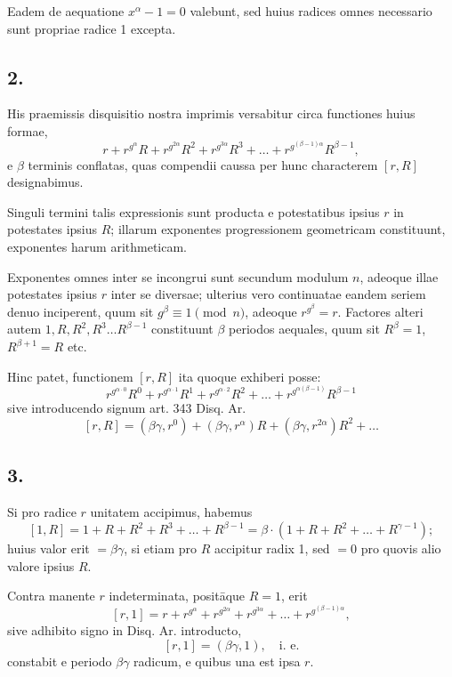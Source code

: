 \documentclass[12pt,a4paper]{article}
\begin{document}
Eadem de aequatione $x^\alpha-1=0$ valebunt, sed huius radices omnes necessario sunt propriae radice 1 excepta.

\subsection*{2.}

His praemissis disquisitio nostra imprimis versabitur circa functiones huius formae,
\[
r + r^{g^\alpha}R + r^{g^{2\alpha}}R^2 + r^{g^{3\alpha}}R^3 + \ldots + r^{g^{(\beta-1)\alpha}}R^{\beta-1},
\]
e $\beta$ terminis conflatas, quas compendii caussa per hunc characterem $[r,R]$ designabimus.

Singuli termini talis expressionis sunt producta e potestatibus ipsius $r$ in potestates ipsius $R$; illarum exponentes progressionem geometricam constituunt, exponentes harum arithmeticam.

Exponentes omnes inter se incongrui sunt secundum modulum $n$, adeoque illae potestates ipsius $r$ inter se diversae; ulterius vero continuatae eandem seriem denuo inciperent, quum sit $g^\beta\equiv 1 \pmod{n}$, adeoque $r^{g^\beta}=r$. Factores alteri autem $1, R, R^2, R^3\ldots R^{\beta-1}$ constituunt $\beta$ periodos aequales, quum sit $R^\beta=1$, $R^{\beta+1}=R$ etc.

Hinc patet, functionem $[r,R]$ ita quoque exhiberi posse:
\[
r^{g^{\alpha\cdot 0}}R^0 + r^{g^{\alpha\cdot 1}}R^1 + r^{g^{\alpha\cdot 2}}R^2 + \ldots + r^{g^{\alpha(\beta-1)}}R^{\beta-1}
\]
sive introducendo signum art. 343 Disq. Ar.
\[
[r,R] = (\beta\gamma, r^0) + (\beta\gamma, r^\alpha)R + (\beta\gamma, r^{2\alpha})R^2 + \ldots
\]

\subsection*{3.}

Si pro radice $r$ unitatem accipimus, habemus
\[
[1,R] = 1 + R + R^2 + R^3 + \ldots + R^{\beta-1} = \beta \cdot (1 + R + R^2 + \ldots + R^{\gamma-1});
\]
huius valor erit $=\beta\gamma$, si etiam pro $R$ accipitur radix 1, sed $=0$ pro quovis alio valore ipsius $R$.

Contra manente $r$ indeterminata, posit\=aque $R=1$, erit
\[
[r,1] = r + r^{g^\alpha} + r^{g^{2\alpha}} + r^{g^{3\alpha}} + \ldots + r^{g^{(\beta-1)\alpha}},
\]
sive adhibito signo in Disq. Ar. introducto,
\[
[r,1] = (\beta\gamma, 1), \quad\text{i. e.}
\]
constabit e periodo $\beta\gamma$ radicum, e quibus una est ipsa $r$.
\end{document}
